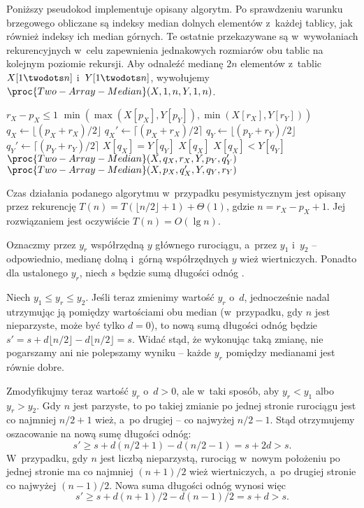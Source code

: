 Poniższy pseudokod implementuje opisany algorytm. Po sprawdzeniu warunku brzegowego obliczane są indeksy median dolnych elementów z~każdej tablicy, jak również indeksy ich median górnych. Te ostatnie przekazywane są w~wywołaniach rekurencyjnych w~celu zapewnienia jednakowych rozmiarów obu tablic na kolejnym poziomie rekursji. Aby odnaleźć medianę $2n$ elementów z~tablic $X[1\twodots n]$ i~$Y[1\twodots n]$, wywołujemy $\proc{Two-Array-Median}(X,1,n,Y,1,n)$.

\begin{codebox}
\li	\If $r_X-p_X\le1$
\li		\Then \Return $\min(\max(X[p_X],Y[p_Y]),\min(X[r_X],Y[r_Y]))$
		\End
\li	$q_X\gets\lfloor(p_X+r_X)/2\rfloor$
\li	$q_X'\gets\lceil(p_X+r_X)/2\rceil$
\li	$q_Y\gets\lfloor(p_Y+r_Y)/2\rfloor$
\li	$q_Y'\gets\lceil(p_Y+r_Y)/2\rceil$
\li	\If $X[q_X]=Y[q_Y]$
\li		\Then \Return $X[q_X]$
		\End
\li	\If $X[q_X]<Y[q_Y]$
\li		\Then \Return $\proc{Two-Array-Median}(X,q_X,r_X,Y,p_Y,q_Y')$
\li		\Else \Return $\proc{Two-Array-Median}(X,p_X,q_X',Y,q_Y,r_Y)$
		\End
\end{codebox}

Czas działania podanego algorytmu w~przypadku pesymistycznym jest opisany przez rekurencję $T(n)=T(\lfloor n/2\rfloor+1)+\Theta(1)$, gdzie $n=r_X-p_X+1$. Jej rozwiązaniem jest oczywiście $T(n)=O(\lg n)$.

\exercise %
Oznaczmy przez $y_r$ współrzędną $y$ głównego rurociągu, a~przez $y_1$ i~$y_2$ -- odpowiednio, medianę dolną i~górną współrzędnych $y$ wież wiertniczych. Ponadto dla ustalonego $y_r$, niech $s$ będzie sumą długości odnóg .

Niech $y_1\le y_r\le y_2$. Jeśli teraz zmienimy wartość $y_r$ o~$d$, jednocześnie nadal utrzymując ją pomiędzy wartościami obu median (w~przypadku, gdy $n$ jest nieparzyste, może być tylko $d=0$), to nową sumą długości odnóg będzie $s'=s+d\lfloor n/2\rfloor-d\lfloor n/2\rfloor=s$. Widać stąd, że wykonując taką zmianę, nie pogarszamy ani nie polepszamy wyniku -- każde $y_r$ pomiędzy medianami jest równie dobre.

Zmodyfikujmy teraz wartość $y_r$ o~$d>0$, ale w~taki sposób, aby $y_r<y_1$ albo $y_r>y_2$. Gdy $n$ jest parzyste, to po takiej zmianie po jednej stronie rurociągu jest co najmniej $n/2+1$ wież, a~po drugiej -- co najwyżej $n/2-1$. Stąd otrzymujemy oszacowanie na nową sumę długości odnóg:
\[
    s' \ge s+d(n/2+1)-d(n/2-1) = s+2d > s.
\]
W~przypadku, gdy $n$ jest liczbą nieparzystą, rurociąg w~nowym położeniu po jednej stronie ma co najmniej $(n+1)/2$ wież wiertniczych, a~po drugiej stronie co najwyżej $(n-1)/2$. Nowa suma długości odnóg wynosi więc
\[
    s' \ge s+d(n+1)/2-d(n-1)/2 = s+d > s.
\]

